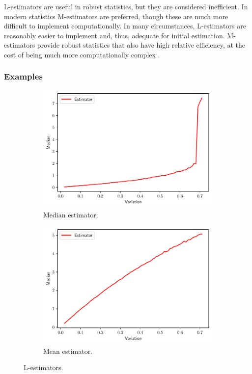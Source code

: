 \documentclass[11pt]{article}
\theoremstyle{definition}
\theoremstyle{remark}
\theoremstyle{remark}
\begin{document}
L-estimators are useful in robust statistics, but they are
considered inefficient. In modern statistics M-estimators are
preferred, though these are much more difficult to implement computationally. In
many circumstances, L-estimators are reasonably easier to implement and, thus,
adequate for initial estimation. M-estimators provide robust
statistics that also have high relative efficiency, at the cost of
being much more computationally complex \cite{andersen2008modern}.

\subsubsection*{Examples}

 \begin{figure}[H]
  \centering
  \begin{subfigure}[t]{0.475\textwidth}
      \centering
      \includegraphics[scale=0.40]{../figs/median.pdf}
      \caption{Median estimator.}
  \end{subfigure}
  \begin{subfigure}[t]{0.475\textwidth}
      \centering
      \includegraphics[scale=0.40]{../figs/mean-L.pdf}
      \caption{Mean estimator.}
  \end{subfigure}
  \caption{L-estimators.}
  \label{fig:L-Estimators_1}
\end{figure}
\end{document}
